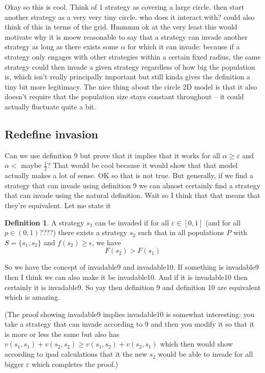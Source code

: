 \documentclass[11pt]{amsart}
\theoremstyle{definition}
\newtheorem{definition}{Definition}
\theoremstyle{remark}
\begin{document}
Okay so this is cool. Think of 1 strategy as covering a large circle. then start another strategy as a very very tiny circle. who does it interact with? could also think of this in terms of the grid. Hmmmm ok at the very least this would motivate why it is moew reasonable to say that a strategy can invade another strategy as long as there exists some $\alpha$ for which it can invade: because if a strategy only engages with other strategies within a certain fixed radius, the same strategy could then invade a given strategy regardless of how big the population is, which isn't really principally important but still kinda gives the definition a tiny bit more legitimacy. The nice thing about the circle 2D model is that it also doesn't require that the population size stays constant throughout -- it could actually fluctuate quite a bit.



\subsection*{Redefine invasion}

Can we use definition 9 but prove that it implies that it works for all $\alpha \geq \varepsilon$ and $\alpha <$ maybe $\frac 1 2$? That would be cool because it would show that that model actually makes a lot of sense. OK so that is not true. But generally, if we find a strategy that can invade using definition 9 we can almost certainly find a strategy that can invade using the natural definition. Wait so I think that that means that they're equivalent. Let me state it

\begin{definition}
  A strategy $s_1$ can be invaded if for all $\varepsilon \in [0,1]$ (and for all $p \in (0,1)$????) there exists a strategy $s_2$ such that in all populations $P$ with $S = \{s_1,s_2\}$ and $f(s_2) \geq \epsilon$, we have \begin{equation*}
    F(s_2) > F(s_1)
  \end{equation*}
\end{definition}

So we have the concept of invadable9 and invadable10. If something is invadable9 then I think we can also make it be invadable10. And if it is invadable10 then certainly it is invadable9. So yay then definition 9 and definition 10 are equivalent which is amazing.

(The proof showing invadable9 implies invadable10 is somewhat interesting: you take a strategy that can invade according to 9 and then you modify it so that it is more or less the same but also has $v(s_1,s_1) + v(s_2,s_2) \geq v(s_1,s_2) + v(s_2,s_1)$ which then would show according to ipad calculations that it the new $s_2$ would be able to invade for all bigger $\varepsilon$ which completes the proof.)
\end{document}

